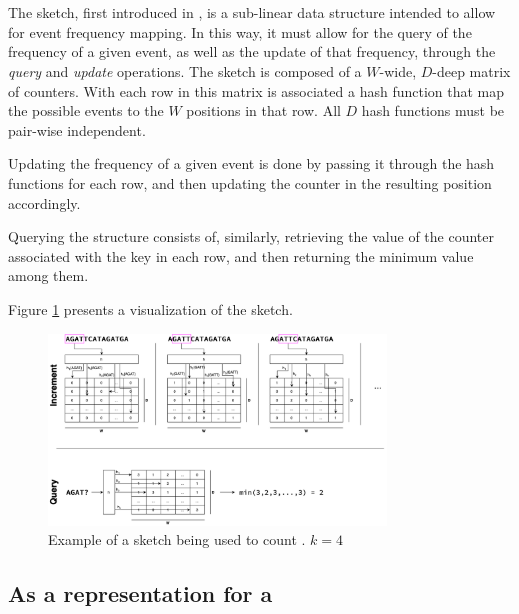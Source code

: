 \section{\cm}
\label{sec:countmin}

The \cm sketch, first introduced in \cite{Cormode2005}, is a sub-linear data structure intended to allow for event frequency mapping.
In this way, it must allow for the query of the frequency of a given event, as well as the update of that frequency, through the
\emph{query} and \emph{update} operations. The sketch is composed of a $W$-wide, $D$-deep matrix of counters. With each row in this
matrix is associated a hash function that map the possible events to the $W$ positions in that row. All $D$ hash functions
must be pair-wise independent.

Updating the frequency of a given event is done by passing it through the hash functions for each row, and then updating the counter in
the resulting position accordingly. 

Querying the structure consists of, similarly, retrieving the value of the counter associated with the key in each row, and then returning
the minimum value among them.

Figure \ref{fig:countminexample} presents a visualization of the \cm sketch.


\begin{figure}[htbp]
	\begin{center}
    \includegraphics[width=0.8\textwidth]{figures/cm-example}
	\end{center}
	\caption{Example of a \cm sketch being used to count \kmers. $k=4$}\label{fig:countminexample}
\end{figure}

\subsection{As a representation for a \dBG}

